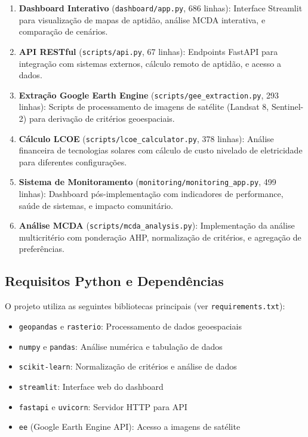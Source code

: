 \documentclass[12pt, a4paper]{article}
\begin{document}
\begin{enumerate}
    \item \textbf{Dashboard Interativo} (\texttt{dashboard/app.py}, 686 linhas): Interface Streamlit para visualização de mapas de aptidão, análise MCDA interativa, e comparação de cenários.
    
    \item \textbf{API RESTful} (\texttt{scripts/api.py}, 67 linhas): Endpoints FastAPI para integração com sistemas externos, cálculo remoto de aptidão, e acesso a dados.
    
    \item \textbf{Extração Google Earth Engine} (\texttt{scripts/gee\_extraction.py}, 293 linhas): Scripts de processamento de imagens de satélite (Landsat 8, Sentinel-2) para derivação de critérios geoespaciais.
    
    \item \textbf{Cálculo LCOE} (\texttt{scripts/lcoe\_calculator.py}, 378 linhas): Análise financeira de tecnologias solares com cálculo de custo nivelado de eletricidade para diferentes configurações.
    
    \item \textbf{Sistema de Monitoramento} (\texttt{monitoring/monitoring\_app.py}, 499 linhas): Dashboard pós-implementação com indicadores de performance, saúde de sistemas, e impacto comunitário.
    
    \item \textbf{Análise MCDA} (\texttt{scripts/mcda\_analysis.py}): Implementação da análise multicritério com ponderação AHP, normalização de critérios, e agregação de preferências.
\end{enumerate}

\subsection{Requisitos Python e Dependências}

O projeto utiliza as seguintes bibliotecas principais (ver \texttt{requirements.txt}):
\begin{itemize}
    \item \texttt{geopandas} e \texttt{rasterio}: Processamento de dados geoespaciais
    \item \texttt{numpy} e \texttt{pandas}: Análise numérica e tabulação de dados
    \item \texttt{scikit-learn}: Normalização de critérios e análise de dados
    \item \texttt{streamlit}: Interface web do dashboard
    \item \texttt{fastapi} e \texttt{uvicorn}: Servidor HTTP para API
    \item \texttt{ee} (Google Earth Engine API): Acesso a imagens de satélite
\end{itemize}
\end{document}

